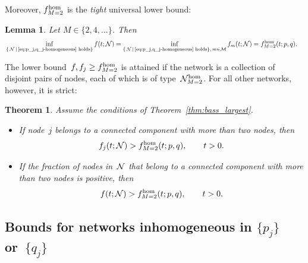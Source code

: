 \documentclass[review]{elsarticle}
\newtheorem{theorem}{Theorem}
\newtheorem{lemma}{Lemma}
\begin{document}
Moreover, $f_{M=2}^{\rm hom}$ is the {\em tight} universal lower bound:
\begin{lemma}
	\label{lem:f_M=2-is-tight}
	Let $M \in\{ 2,4, \dots \}$. 
	Then
	\begin{eqnarray*}
&\inf_{\{ \, {\cal N} \, | \, \text{\eqref{eq:p_j,q_j-homogeneous} holds}\}} f(t;{\cal N}) = %
  \inf_{\{ \, {\cal N} \, | \, \text{\eqref{eq:p_j,q_j-homogeneous} holds}\}, \, m \in \cal M} f_m(t;{\cal N}) = f_{M=2}^{\rm hom}(t;p,q).	
	\end{eqnarray*}
\end{lemma}


 The lower bound~$f,f_j\ge  f_{M=2}^{\rm hom}$ is attained 
  if the network is a collection of disjoint pairs of nodes, 
  each of which is of type~${\cal N}_{M=2}^{\rm hom}$. For all other networks,  however,  it is strict:
\begin{theorem}
	\label{thm:f_j>f_M=2^hom}
	Assume the conditions of Theorem~\ref{thm:bass_largest}. 
	\begin{itemize}
		\item 
		If node~$j$ belongs to a connected component with more than two nodes, then 
		\begin{equation}
			\label{eq:f_m>f_2nodes}
			f_j(t;{\cal N}) > f_{M=2}^{\rm hom}(t;p,q), \qquad t>0.
		\end{equation}
		
		\item 	If the fraction of nodes  in~$\cal N$ that belong to a connected component with more than two nodes is positive, then
	\begin{equation}
		\label{eq:f>f_M=2^hom-thm}
		f(t;{\cal N})> f_{M=2}^{\rm hom}(t;p,q), \qquad t > 0.
	\end{equation}
			\end{itemize}
\end{theorem}




\subsection{Bounds for networks   inhomogeneous in 
	$\{p_j\}$ or~$\{q_j\}$}
  \label{sec:inhomogeneous-pj-qj}
\end{document}
